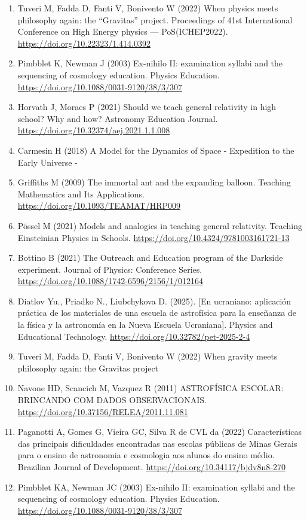 {\begin{enumerate}
\item Tuveri M, Fadda D, Fanti V, Bonivento W (2022) When physics meets philosophy again: the “Gravitas” project. Proceedings of 41st International Conference on High Energy physics — PoS(ICHEP2022). \url{https://doi.org/10.22323/1.414.0392}
\item Pimbblet K, Newman J (2003) Ex-nihilo II: examination syllabi and the sequencing of cosmology education. Physics Education. \url{https://doi.org/10.1088/0031-9120/38/3/307}
\item Horvath J, Moraes P (2021) Should we teach general relativity in high school? Why and how? Astronomy Education Journal. \url{https://doi.org/10.32374/aej.2021.1.1.008}
\item Carmesin H (2018) A Model for the Dynamics of Space - Expedition to the Early Universe -
\item Griffiths M (2009) The immortal ant and the expanding balloon. Teaching Mathematics and Its Applications. \url{https://doi.org/10.1093/TEAMAT/HRP009}
\item Pössel M (2021) Models and analogies in teaching general relativity. Teaching Einsteinian Physics in Schools. \url{https://doi.org/10.4324/9781003161721-13}
\item Bottino B (2021) The Outreach and Education program of the Darkside experiment. Journal of Physics: Conference Series. \url{https://doi.org/10.1088/1742-6596/2156/1/012164}
\item Diatlov Yu., Priadko N., Liubchykova D. (2025). [En ucraniano: aplicación práctica de los materiales de una escuela de astrofísica para la enseñanza de la física y la astronomía en la Nueva Escuela Ucraniana]. Physics and Educational Technology. \url{https://doi.org/10.32782/pet-2025-2-4}
\item Tuveri M, Fadda D, Fanti V, Bonivento W (2022) When gravity meets philosophy again: the Gravitas project
\item Navone HD, Scancich M, Vazquez R (2011) ASTROFÍSICA ESCOLAR: BRINCANDO COM DADOS OBSERVACIONAIS. \url{https://doi.org/10.37156/RELEA/2011.11.081}
\item Paganotti A, Gomes G, Vieira GC, Silva R de CVL da (2022) Características das principais dificuldades encontradas nas escolas públicas de Minas Gerais para o ensino de astronomia e cosmologia aos alunos do ensino médio. Brazilian Journal of Development. \url{https://doi.org/10.34117/bjdv8n8-270}
\item Pimbblet KA, Newman JC (2003) Ex-nihilo II: examination syllabi and the sequencing of cosmology education. Physics Education. \url{https://doi.org/10.1088/0031-9120/38/3/307}

\end{enumerate}}
